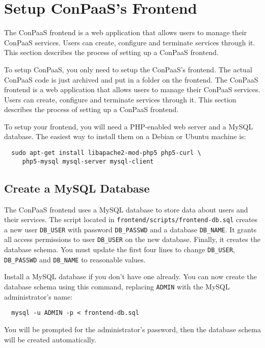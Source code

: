 \documentclass[10pt]{article}
\begin{document}
\section{Setup ConPaaS's Frontend}
\label{sec:frontend}

The ConPaaS frontend is a web application that allows users to manage
their ConPaaS services. Users can create, configure and terminate
services through it. This section describes the process of setting up
a ConPaaS frontend.

To setup ConPaaS, you only need to setup the ConPaaS's frontend. The
actual ConPaaS code is just archived and put in a folder on the frontend.
The ConPaaS frontend is a web application that allows users to manage
their ConPaaS services. Users can create, configure and terminate
services through it. This section describes the process of setting up
a ConPaaS frontend.

To setup your frontend, you will need a PHP-enabled web server and a
MySQL database. The easiest way to install them on a Debian or Ubuntu
machine is:

\begin{verbatim}
  sudo apt-get install libapache2-mod-php5 php5-curl \
     php5-mysql mysql-server mysql-client
\end{verbatim}

\subsection{Create a MySQL Database}

The ConPaaS frontend uses a MySQL database to store data about users
and their services. The script located in
\verb+frontend/scripts/frontend-db.sql+ creates a new user
\verb+DB_USER+ with password \verb+DB_PASSWD+ and a database
\verb+DB_NAME+. It grants all access permissions to user
\verb+DB_USER+ on the new database. Finally, it creates the database
schema. You must update the first four lines to change \verb+DB_USER+,
\verb+DB_PASSWD+ and \verb+DB_NAME+ to reasonable values.

Install a MySQL database if you don't have one already. You can now
create the database schema using this command, replacing \verb+ADMIN+
with the MySQL administrator's name:

\begin{verbatim}
  mysql -u ADMIN -p < frontend-db.sql
\end{verbatim}

You will be prompted for the administrator's password, then the
database schema will be created automatically.
\end{document}

